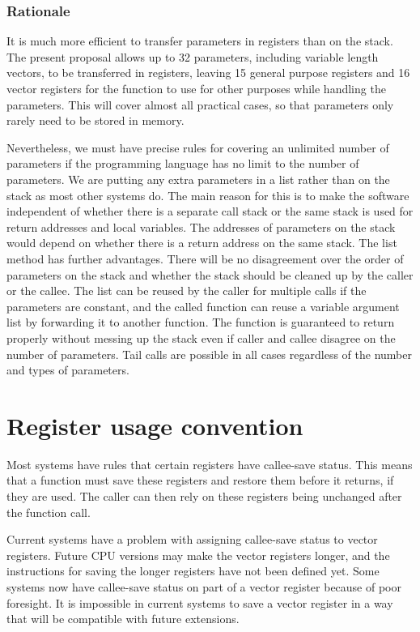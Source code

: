 \documentclass[forwardcom.tex]{subfiles}
\begin{document}
\subsubsection{Rationale}
It is much more efficient to transfer parameters in registers than on the stack. The present proposal allows up to 32 parameters, including variable length vectors, to be transferred in registers, leaving 15 general purpose registers and 16 vector registers for the function to use for other purposes while handling the parameters. This will cover almost all practical cases, so that parameters only rarely need to be stored in memory. 
\vspace{2mm}

Nevertheless, we must have precise rules for covering an unlimited number of parameters if the programming language has no limit to the number of parameters. We are putting any extra parameters in a list rather than on the stack as most other systems do. The main reason for this is to make the software independent of whether there is a separate call stack or the same stack is used for return addresses and local variables. The addresses of parameters on the stack would depend on whether there is a return address on the same stack. The list method has further advantages. There will be no disagreement over the order of parameters on the stack and whether the stack should be cleaned up by the caller or the callee. The list can be reused by the caller for multiple calls if the parameters are constant, and the called function can reuse a variable argument list by forwarding it to another function. The function is guaranteed to return properly without messing up the stack even if caller and callee disagree on the number of parameters. Tail calls are possible in all cases regardless of the number and types of parameters. 
\vspace{2mm}

\section{Register usage convention} \label{chap:registerUsageConvention}
Most systems have rules that certain registers have callee-save status. This means that a function must save these registers and restore them before it returns, if they are used. The caller can then rely on these registers being unchanged after the function call.
\vspace{2mm}

Current systems have a problem with assigning callee-save status to vector registers. Future CPU versions may make the vector registers longer, and the instructions for saving the longer registers have not been defined yet. Some systems now have callee-save status on part of a vector register because of poor foresight. It is impossible in current systems to save a vector register in a way that will be compatible with future extensions. 
\vspace{2mm}
\end{document}
